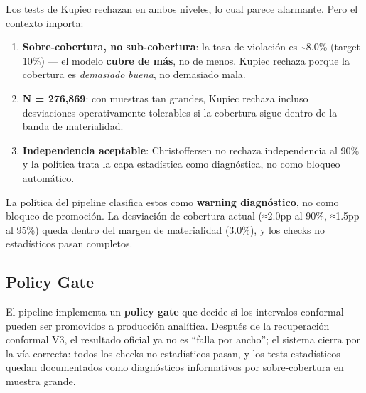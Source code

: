 \documentclass[
  spanish,
  11pt,
  letterpaper,
]{scrbook}
\providecommand{\tightlist}{%
  \setlength{\itemsep}{0pt}\setlength{\parskip}{0pt}}
\theoremstyle{plain}
\theoremstyle{remark}
\begin{document}
\begin{tcolorbox}[enhanced jigsaw, arc=.35mm, bottomrule=.15mm, bottomtitle=1mm, breakable, colback=white, colbacktitle=quarto-callout-warning-color!10!white, colframe=quarto-callout-warning-color-frame, coltitle=black, left=2mm, leftrule=.75mm, opacityback=0, opacitybacktitle=0.6, rightrule=.15mm, title=\textcolor{quarto-callout-warning-color}{\faExclamationTriangle}\hspace{0.5em}{Tests Estadísticos Rechazados --- ¿Problema Real?}, titlerule=0mm, toprule=.15mm, toptitle=1mm]

Los tests de Kupiec rechazan en ambos niveles, lo cual parece alarmante.
Pero el contexto importa:

\begin{enumerate}
\def\labelenumi{\arabic{enumi}.}
\tightlist
\item
  \textbf{Sobre-cobertura, no sub-cobertura}: la tasa de violación es
  \textasciitilde8.0\% (target 10\%) --- el modelo \textbf{cubre de
  más}, no de menos. Kupiec rechaza porque la cobertura es
  \emph{demasiado buena}, no demasiado mala.
\item
  \textbf{N = 276,869}: con muestras tan grandes, Kupiec rechaza incluso
  desviaciones operativamente tolerables si la cobertura sigue dentro de
  la banda de materialidad.
\item
  \textbf{Independencia aceptable}: Christoffersen no rechaza
  independencia al 90\% y la política trata la capa estadística como
  diagnóstica, no como bloqueo automático.
\end{enumerate}

La política del pipeline clasifica estos como \textbf{warning
diagnóstico}, no como bloqueo de promoción. La desviación de cobertura
actual (≈2.0pp al 90\%, ≈1.5pp al 95\%) queda dentro del margen de
materialidad (3.0\%), y los checks no estadísticos pasan completos.

\end{tcolorbox}

\subsection{Policy Gate}\label{policy-gate}

El pipeline implementa un \textbf{policy gate} que decide si los
intervalos conformal pueden ser promovidos a producción analítica.
Después de la recuperación conformal V3, el resultado oficial ya no es
``falla por ancho''; el sistema cierra por la vía correcta: todos los
checks no estadísticos pasan, y los tests estadísticos quedan
documentados como diagnósticos informativos por sobre-cobertura en
muestra grande.
\end{document}
